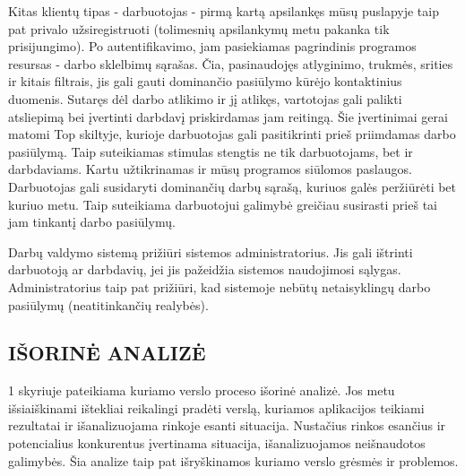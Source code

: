 \documentclass{VUMIFPSkursinis}
\begin{document}
	Kitas klientų tipas - darbuotojas - pirmą kartą apsilankęs mūsų puslapyje taip pat privalo užsiregistruoti (tolimesnių apsilankymų metu pakanka tik prisijungimo). Po autentifikavimo, jam pasiekiamas pagrindinis programos resursas - darbo sklelbimų sąrašas. Čia, pasinaudojęs atlyginimo, trukmės, srities ir kitais filtrais, jis gali gauti dominančio pasiūlymo kūrėjo kontaktinius duomenis. Sutaręs dėl darbo atlikimo ir jį atlikęs, vartotojas gali palikti atsliepimą bei įvertinti darbdavį priskirdamas jam reitingą. Šie įvertinimai gerai matomi Top skiltyje, kurioje darbuotojas gali pasitikrinti prieš priimdamas darbo pasiūlymą.  Taip suteikiamas stimulas stengtis ne tik darbuotojams, bet ir darbdaviams. Kartu užtikrinamas ir mūsų programos siūlomos paslaugos. Darbuotojas gali susidaryti dominančių darbų sąrašą, kuriuos galės peržiūrėti bet kuriuo metu. Taip suteikiama darbuotojui galimybė greičiau susirasti prieš tai jam tinkantį darbo pasiūlymų.

Darbų valdymo sistemą prižiūri sistemos administratorius. Jis gali ištrinti darbuotoją ar darbdavių, jei jis pažeidžia sistemos naudojimosi sąlygas. Administratorius taip pat prižiūri, kad sistemoje nebūtų netaisyklingų darbo pasiūlymų (neatitinkančių realybės). 
\newpage

\subsection{IŠORINĖ ANALIZĖ}
1 skyriuje pateikiama kuriamo verslo proceso išorinė analizė. Jos metu išsiaiškinami ištekliai reikalingi pradėti verslą, kuriamos aplikacijos teikiami rezultatai ir išanalizuojama rinkoje esanti situacija. Nustačius rinkos esančius ir potencialius konkurentus įvertinama situacija, išanalizuojamos neišnaudotos galimybės. Šia analize taip pat išryškinamos kuriamo verslo grėsmės ir problemos.
\end{document}

